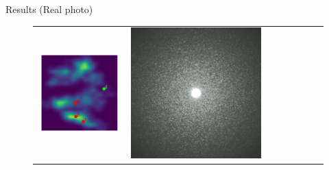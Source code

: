 \documentclass[final]{beamer}
\newlength{\twocolwid}
\newlength{\resultwidth}
\begin{document}
\begin{frame}[t]
\begin{columns}[t]
\begin{column}{\twocolwid}
\begin{block}{Results (Real photo)}
\begin{figure}[t]
\begin{tabular}{ccrclccc}
            		\includegraphics[width=\resultwidth]{images/real/flake/posterior.pdf} &
            		\includegraphics[width=\resultwidth]{images/real/flake/good1.jpg} &

\end{tabular}
\end{figure}
\end{block}
\end{column}
\end{columns}
\end{frame}
\end{document}
